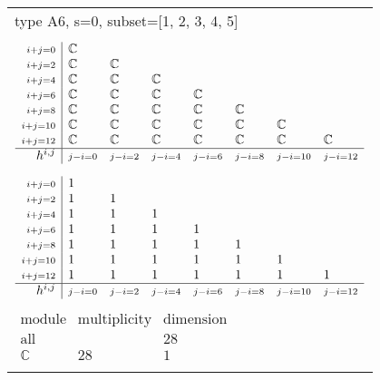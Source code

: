 \documentclass[crop,border=2mm]{standalone}
\begin{document}
\begin{tabular}{l}
{\huge type A6, s=0, subset=[1, 2, 3, 4, 5]}\\ \\


$\displaystyle
\begin{array}{r|l l l l l l l}
	{\scriptstyle i+j=0}&\mathbb{C}&&&&&&\\
	{\scriptstyle i+j=2}&\mathbb{C}&\mathbb{C}&&&&&\\
	{\scriptstyle i+j=4}&\mathbb{C}&\mathbb{C}&\mathbb{C}&&&&\\
	{\scriptstyle i+j=6}&\mathbb{C}&\mathbb{C}&\mathbb{C}&\mathbb{C}&&&\\
	{\scriptstyle i+j=8}&\mathbb{C}&\mathbb{C}&\mathbb{C}&\mathbb{C}&\mathbb{C}&&\\
	{\scriptstyle i+j=10}&\mathbb{C}&\mathbb{C}&\mathbb{C}&\mathbb{C}&\mathbb{C}&\mathbb{C}&\\
	{\scriptstyle i+j=12}&\mathbb{C}&\mathbb{C}&\mathbb{C}&\mathbb{C}&\mathbb{C}&\mathbb{C}&\mathbb{C}\\
	\hline h^{i,j}&{\scriptstyle j-i=0}&{\scriptstyle j-i=2}&{\scriptstyle j-i=4}&{\scriptstyle j-i=6}&{\scriptstyle j-i=8}&{\scriptstyle j-i=10}&{\scriptstyle j-i=12}
\end{array}
$ \\ \\


$\displaystyle
\begin{array}{r|l l l l l l l}
	{\scriptstyle i+j=0}&1&&&&&&\\
	{\scriptstyle i+j=2}&1&1&&&&&\\
	{\scriptstyle i+j=4}&1&1&1&&&&\\
	{\scriptstyle i+j=6}&1&1&1&1&&&\\
	{\scriptstyle i+j=8}&1&1&1&1&1&&\\
	{\scriptstyle i+j=10}&1&1&1&1&1&1&\\
	{\scriptstyle i+j=12}&1&1&1&1&1&1&1\\
	\hline h^{i,j}&{\scriptstyle j-i=0}&{\scriptstyle j-i=2}&{\scriptstyle j-i=4}&{\scriptstyle j-i=6}&{\scriptstyle j-i=8}&{\scriptstyle j-i=10}&{\scriptstyle j-i=12}
\end{array}
$ \\ \\


$\displaystyle
\begin{array}{rll}
	\text{module}&\text{multiplicity}&\text{dimension} \\ \hline \text{all}&&28 \\
	\mathbb{C}&28&1
\end{array}
$ \\ \\

\end{tabular}
\end{document}
